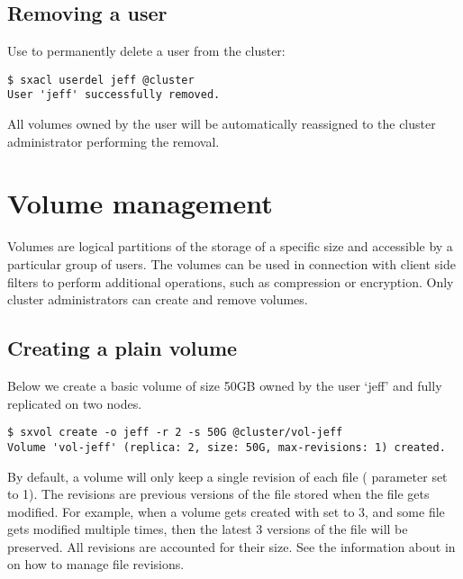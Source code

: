 \subsection{Removing a user}
Use  to permanently delete a user from the cluster:
\begin{lstlisting}
$ sxacl userdel jeff @cluster
User 'jeff' successfully removed.
\end{lstlisting}
All volumes owned by the user will be automatically reassigned to the
cluster administrator performing the removal.

\section{Volume management} \label{sec:volumes}
Volumes are logical partitions of the \SX storage of a specific size and accessible
by a particular group of users. The volumes can be used in connection with client
side filters to perform additional operations, such as compression or encryption.
Only cluster administrators can create and remove volumes.

\subsection{Creating a plain volume}
Below we create a basic volume of size 50GB owned by the user `jeff' and fully replicated on two nodes.
\begin{lstlisting}
$ sxvol create -o jeff -r 2 -s 50G @cluster/vol-jeff
Volume 'vol-jeff' (replica: 2, size: 50G, max-revisions: 1) created.
\end{lstlisting}
By default, a volume will only keep a single revision of each file (
parameter set to 1). The revisions are previous versions of the file stored when the file
gets modified. For example, when a volume gets created with  set to
3, and some file gets modified multiple times, then the latest 3 versions of the file will
be preserved. All revisions are accounted for their size. See the information about
 in  on how to manage file revisions.

